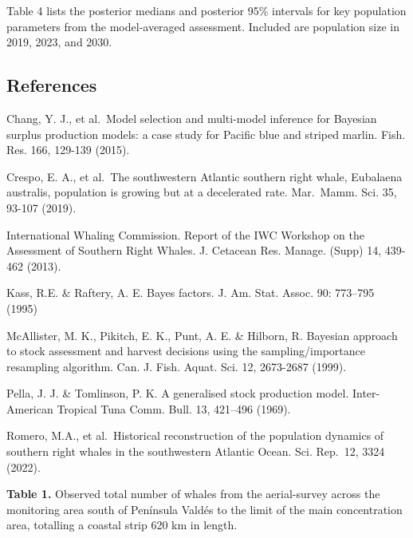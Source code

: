 \documentclass[
]{article}
\begin{document}
Table 4 lists the posterior medians and posterior 95\% intervals for key
population parameters from the model-averaged assessment. Included are
population size in 2019, 2023, and 2030.

\hypertarget{references}{%
\subsection{References}\label{references}}

Chang, Y. J., et al.~Model selection and multi-model inference for
Bayesian surplus production models: a case study for Pacific blue and
striped marlin. Fish. Res. 166, 129-139 (2015).

Crespo, E. A., et al.~The southwestern Atlantic southern right whale,
Eubalaena australis, population is growing but at a decelerated rate.
Mar.~Mamm. Sci. 35, 93-107 (2019).

International Whaling Commission. Report of the IWC Workshop on the
Assessment of Southern Right Whales. J. Cetacean Res. Manage. (Supp) 14,
439-462 (2013).

Kass, R.E. \& Raftery, A. E. Bayes factors. J. Am. Stat. Assoc. 90:
773--795 (1995)

McAllister, M. K., Pikitch, E. K., Punt, A. E. \& Hilborn, R. Bayesian
approach to stock assessment and harvest decisions using the
sampling/importance resampling algorithm. Can. J. Fish. Aquat. Sci. 12,
2673-2687 (1999).

Pella, J. J. \& Tomlinson, P. K. A generalised stock production model.
Inter-American Tropical Tuna Comm. Bull. 13, 421--496 (1969).

Romero, M.A., et al.~Historical reconstruction of the population
dynamics of southern right whales in the southwestern Atlantic Ocean.
Sci. Rep.~12, 3324 (2022).

\newpage

\textbf{Table 1.} Observed total number of whales from the aerial-survey
across the monitoring area south of Península Valdés to the limit of the
main concentration area, totalling a coastal strip 620 km in length.
\end{document}
